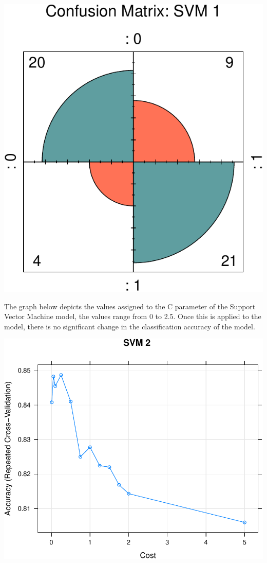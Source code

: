 \documentclass[11pt,preprint, authoryear]{elsarticle}
\numberwithin{equation}{section}
\numberwithin{figure}{section}
\numberwithin{table}{section}
\begin{document}
\includegraphics{ML_project_files/figure-latex/unnamed-chunk-19-1.pdf}

\newpage

The graph below depicts the values assigned to the C parameter of the
Support Vector Machine model, the values range from 0 to 2.5. Once this
is applied to the model, there is no significant change in the
classification accuracy of the model.

\includegraphics{ML_project_files/figure-latex/unnamed-chunk-20-1.pdf}
\end{document}
